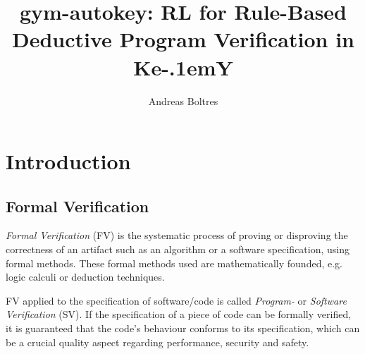 \documentclass[runningheads,a4paper]{llncs}
\begin{document}

\mainmatter  %

\title{gym-autokey: RL for Rule-Based Deductive Program Verification in Ke\kern-.1em{Y}}


%
%
\author{Andreas Boltres}
%


\maketitle


\section*{Introduction}

\subsection*{Formal Verification}

\textit{Formal Verification} (FV) is the systematic process of proving or disproving the correctness of an artifact such as an algorithm or a software specification, using formal methods. These formal methods used are mathematically founded, e.g. logic calculi or deduction techniques.

FV applied to the specification of software/code is called \textit{Program-} or \textit{Software Verification} (SV). If the specification of a piece of code can be formally verified, it is guaranteed that the code's behaviour conforms to its specification, which can be a crucial quality aspect regarding performance, security and safety.
\end{document}
